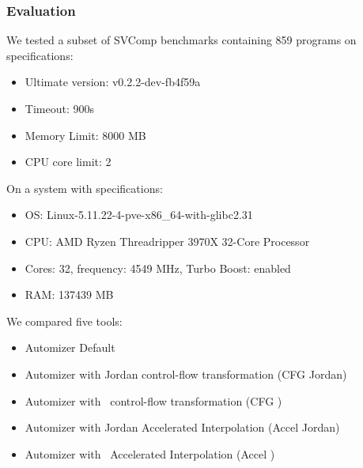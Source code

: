 \begin{frame}[t]
	\frametitle{Evaluation}
		We tested a subset of SVComp benchmarks containing 859 programs on specifications: \\
		\begin{itemize}
			\item Ultimate version: v0.2.2-dev-fb4f59a \\
			\item Timeout: 900s \\
			\item Memory Limit: 8000 MB\\
			\item CPU core limit: 2
		\end{itemize} \vspace*{0.25cm}
		On a system with specifications:
		\begin{itemize}
			\item OS: Linux-5.11.22-4-pve-x86\_64-with-glibc2.31 \\
			\item CPU: AMD Ryzen Threadripper 3970X 32-Core Processor \\
			\item Cores: 32, frequency: 4549 MHz, Turbo Boost: enabled \\
			\item RAM: 137439 MB
		\end{itemize} \vspace*{0.25cm}
	We compared five tools:
	\begin{itemize}
		\item Automizer Default \\
		\item Automizer with Jordan control-flow transformation (\color{emblue}CFG Jordan) \\
		\item Automizer with \qvasr\ control-flow transformation (\color{emblue}CFG \qvasr)\\
		\item Automizer with Jordan Accelerated Interpolation (\color{emblue}Accel Jordan) \\
		\item Automizer with \qvasr\ Accelerated Interpolation (\color{emblue}Accel \qvasr) \\
	\end{itemize}
\end{frame}

